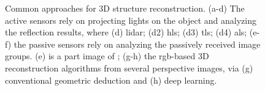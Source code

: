 \begin{figure}[htb!]
  \begin{center}
  \end{center}
  \caption[Common approaches for 3D structure reconstruction]{
    Common approaches for 3D structure reconstruction. (a-d) The active sensors rely on projecting lights on the object and analyzing the reflection results, where (d) \acrfull{lidar}; (d2) \acrfull{hls}; (d3) \acrfull{tls}; (d4) \acrfull{als}; (e-f) the passive sensors rely on analyzing the passively received image groups. (e) is a part image of \citep[Fig.~6]{schima_imagine_2016}; (g-h) the \gls{rgb}-based 3D reconstruction algorithms from several perspective images, via (g) conventional geometric deduction and (h) deep learning.
  }
  \label{fig:int2}
\end{figure}